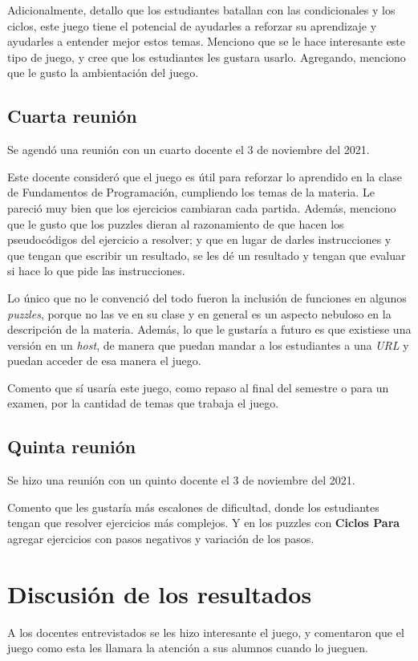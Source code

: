 Adicionalmente, detallo que los estudiantes batallan con las condicionales y los ciclos, este juego tiene el potencial de ayudarles a reforzar su aprendizaje y ayudarles a entender mejor estos temas. Menciono que se le hace interesante este tipo de juego, y cree que los estudiantes les gustara usarlo. Agregando, menciono que le gusto la ambientación del juego.

\subsection{Cuarta reunión}
Se agendó una reunión con un cuarto docente el 3 de noviembre del 2021. 

Este docente consideró que el juego es útil para reforzar lo aprendido en la clase de Fundamentos de Programación, cumpliendo los temas de la materia. Le pareció muy bien que los ejercicios cambiaran cada partida. Además, menciono que le gusto que los puzzles dieran al razonamiento de que hacen los pseudocódigos del ejercicio a resolver; y que en lugar de darles instrucciones y que tengan que escribir un resultado, se les dé un resultado y tengan que evaluar si hace lo que pide las instrucciones.

Lo único que no le convenció del todo fueron la inclusión de funciones en algunos \textit{puzzles}, porque no las ve en su clase y en general es un aspecto nebuloso en la descripción de la materia. Además, lo que le gustaría a futuro es que existiese una versión en un \textit{host}, de manera que puedan mandar a los estudiantes a una \textit{URL} y puedan acceder de esa manera el juego.

Comento que sí usaría este juego, como repaso al final del semestre o para un examen, por la cantidad de temas que trabaja el juego.

\subsection{Quinta reunión}
Se hizo una reunión con un quinto docente el 3 de noviembre del 2021.

Comento que les gustaría más escalones de dificultad, donde los estudiantes tengan que resolver ejercicios más complejos. Y en los puzzles con \textbf{Ciclos Para} agregar ejercicios con pasos negativos y variación de los pasos.

\section{Discusión de los resultados}
A los docentes entrevistados se les hizo interesante el juego, y comentaron que el juego como esta les llamara la atención a sus alumnos cuando lo jueguen.

